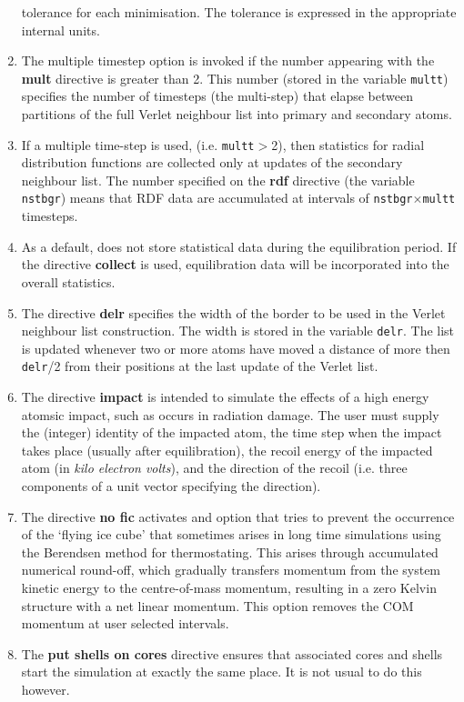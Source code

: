 \begin{enumerate}
      tolerance for each minimisation. The tolerance is expressed in
      the appropriate internal units.
\item The \D{} multiple timestep option is invoked if the number
      appearing with the {\bf mult} directive is greater than 2. This
      number (stored in the variable {\tt multt}) specifies the number
      of timesteps (the multi-step) that elapse between partitions of 
      the full Verlet neighbour list into primary and secondary atoms.
\item If a multiple time-step is used, (i.e. {\tt multt}$>$2), then
      statistics  for radial distribution functions are collected
      only at updates of the secondary neighbour list. The 
      number specified on the {\bf rdf} directive (the variable 
      {\tt nstbgr}) means that RDF data are accumulated at intervals
      of {\tt nstbgr}$\times${\tt multt} timesteps.
\item As a default, \D{} does not store statistical data during
      the equilibration period. If the directive {\bf collect} is
      used, equilibration data will be incorporated into the overall
      statistics.
\item The directive {\bf delr} specifies the width of the border to be used in
      the Verlet neighbour list construction. The
      width is stored in the variable {\tt delr}. The list is updated whenever
      two or more atoms have moved a distance of more then {\tt delr}/2 from
      their positions at the last update of the Verlet list.
\item The directive {\bf impact} is intended to simulate the effects of a high
      energy atomsic impact, such as occurs in radiation damage. The user must
      supply the (integer) identity of the impacted atom, the time step when
      the impact takes place (usually after equilibration), the recoil energy
      of the impacted atom (in {\em kilo electron volts}), and the direction
      of the recoil (i.e. three components of a unit vector specifying the
      direction).
\item The directive {\bf no fic} activates and option that tries to prevent
  the occurrence of the `flying ice cube' that sometimes arises in long time
  simulations using the Berendsen method for thermostating. This arises
  through accumulated numerical round-off, which gradually transfers momentum
  from the system kinetic energy to the centre-of-mass momentum, resulting in
  a zero Kelvin structure with a net linear momentum. This option removes the
  COM momentum at user selected intervals.
\item The {\bf put shells on cores} directive ensures that associated cores
  and shells start the simulation at exactly the same place. It is not usual
  to do this however.
\end{enumerate}

